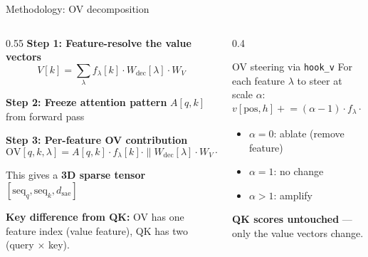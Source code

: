 \documentclass[aspectratio=169]{beamer}
\begin{document}
\begin{frame}{Methodology: OV decomposition}
\begin{columns}
\begin{column}{0.55\textwidth}
\textbf{Step 1: Feature-resolve the value vectors}
\[
V[k] = \sum_\lambda f_\lambda[k] \cdot W_{\text{dec}}[\lambda] \cdot W_V
\]

\textbf{Step 2: Freeze attention pattern} $A[q,k]$ from forward pass

\textbf{Step 3: Per-feature OV contribution}
\[
\text{OV}[q, k, \lambda] = A[q,k] \cdot f_\lambda[k] \cdot \|W_{\text{dec}}[\lambda] \cdot W_V \cdot W_O\|
\]

This gives a \textbf{3D sparse tensor} $[\text{seq}_q, \text{seq}_k, d_{\text{sae}}]$

\vspace{0.5em}
\textbf{Key difference from QK:} OV has one feature index (value feature), QK has two (query $\times$ key).
\end{column}
\begin{column}{0.4\textwidth}
\begin{block}{OV steering via \texttt{hook\_v}}
\small
For each feature $\lambda$ to steer at scale $\alpha$:
\[
v[\text{pos}, h] \mathrel{+}= (\alpha - 1) \cdot f_\lambda \cdot (W_{\text{dec}}[\lambda] \cdot W_V^h)
\]
\begin{itemize}
    \item $\alpha = 0$: ablate (remove feature)
    \item $\alpha = 1$: no change
    \item $\alpha > 1$: amplify
\end{itemize}

\vspace{0.3em}
\textbf{QK scores untouched} --- only the value vectors change.
\end{block}
\end{column}
\end{columns}
\end{frame}
\end{document}
